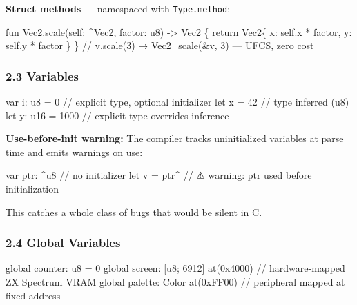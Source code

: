 \documentclass[
  11pt,
]{article}
\newenvironment{Shaded}{}{}
\newcommand{\NormalTok}[1]{#1}
\begin{document}
\textbf{Struct methods} --- namespaced with \texttt{Type.method}:

\begin{Shaded}
\begin{Highlighting}[]
\NormalTok{fun Vec2.scale(self: \^{}Vec2, factor: u8) {-}\textgreater{} Vec2 \{}
\NormalTok{    return Vec2\{ x: self.x * factor, y: self.y * factor \}}
\NormalTok{\}}
\NormalTok{// v.scale(3) → Vec2\_scale(\&v, 3)  — UFCS, zero cost}
\end{Highlighting}
\end{Shaded}

\subsubsection{2.3 Variables}\label{variables}

\begin{Shaded}
\begin{Highlighting}[]
\NormalTok{var i: u8 = 0       // explicit type, optional initializer}
\NormalTok{let x = 42          // type inferred (u8)}
\NormalTok{let y: u16 = 1000   // explicit type overrides inference}
\end{Highlighting}
\end{Shaded}

\textbf{Use-before-init warning:} The compiler tracks uninitialized
variables at parse time and emits warnings on use:

\begin{Shaded}
\begin{Highlighting}[]
\NormalTok{var ptr: \^{}u8          // no initializer}
\NormalTok{let v = ptr\^{}          // ⚠ warning: ptr used before initialization}
\end{Highlighting}
\end{Shaded}

This catches a whole class of bugs that would be silent in C.

\subsubsection{2.4 Global Variables}\label{global-variables}

\begin{Shaded}
\begin{Highlighting}[]
\NormalTok{global counter: u8 = 0}
\NormalTok{global screen: [u8; 6912] at(0x4000)   // hardware{-}mapped ZX Spectrum VRAM}
\NormalTok{global palette: Color at(0xFF00)        // peripheral mapped at fixed address}
\end{Highlighting}
\end{Shaded}
\end{document}
